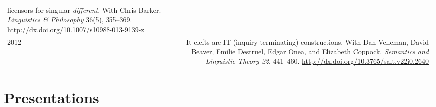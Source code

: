 \documentclass[12pt]{article}
\newcommand{\doi}[1]{\url{http://dx.doi.org/#1}}
\newcommand{\refmark}{\textcolor{gray}{\textdagger}}
\begin{document}
\begin{longtable}{LR}
          licensors for singular \textit{different}.\newline
          With Chris Barker.\newline
          \textit{Linguistics \& Philosophy} 36(5), 355--369.\newline
          \doi{10.1007/s10988-013-9139-z}\\ %
  2012  & It-clefts are IT (inquiry-terminating) constructions.\newline
          With Dan Velleman, David Beaver, Emilie Destruel, Edgar Onea, and
          Elizabeth Coppock.\newline
          \textit{Semantics and Linguistic Theory 22}, 441--460.\newline
          \doi{10.3765/salt.v22i0.2640}
\end{longtable}
\endgroup

\medskip

\section*{Presentations}
\end{document}
